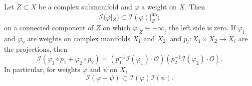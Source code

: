 \begin{theorem}\label{thm:multiplier-restriction-subadditivity}
Let $Z\subset X$ be a complex submanifold and $\varphi$ a weight on $X$. Then
\begin{equation}\label{eq:multiplier-restriction}
 \mathcal I(\varphi|_Z)\subset\mathcal I(\varphi)|_Z^{\mathrm{im}};
\end{equation}
on a connected component of $Z$ on which $\varphi|_Z\equiv-\infty$, the left side is zero. If $\varphi_1$ and $\varphi_2$ are weights on complex manifolds $X_1$ and $X_2$, and $p_i\colon X_1\times X_2\to X_i$ are the projections, then
\begin{equation}\label{eq:multiplier-external-product}
 \mathcal I(\varphi_1\circ p_1+\varphi_2\circ p_2)
 =(p_1^{-1}\mathcal I(\varphi_1)\cdot\mathcal O)
  (p_2^{-1}\mathcal I(\varphi_2)\cdot\mathcal O).
\end{equation}
In particular, for weights $\varphi$ and $\psi$ on $X$,
\begin{equation}\label{eq:multiplier-subadditivity}
 \mathcal I(\varphi+\psi)\subset\mathcal I(\varphi)\mathcal I(\psi).
\end{equation}
\end{theorem}
